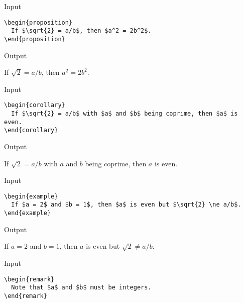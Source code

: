 \documentclass[a4paper, 11pt]{article}
\begin{document}
\begin{itembox}[l]{Input}
\begin{verbatim}
\begin{proposition}
  If $\sqrt{2} = a/b$, then $a^2 = 2b^2$.
\end{proposition}
\end{verbatim}
\end{itembox}

\begin{itembox}[l]{Output}
  \begin{proposition}
    If $\sqrt{2} = a/b$, then $a^2 = 2b^2$.
  \end{proposition}
\end{itembox}

\begin{itembox}[l]{Input}
\begin{verbatim}
\begin{corollary}
  If $\sqrt{2} = a/b$ with $a$ and $b$ being coprime, then $a$ is even.
\end{corollary}
\end{verbatim}
\end{itembox}

\begin{itembox}[l]{Output}
  \begin{corollary}
    If $\sqrt{2} = a/b$ with $a$ and $b$ being coprime, then $a$ is even.
  \end{corollary}
\end{itembox}

\begin{itembox}[l]{Input}
\begin{verbatim}
\begin{example}
  If $a = 2$ and $b = 1$, then $a$ is even but $\sqrt{2} \ne a/b$.
\end{example}
\end{verbatim}
\end{itembox}

\begin{itembox}[l]{Output}
  \begin{example}
    If $a = 2$ and $b = 1$, then $a$ is even but $\sqrt{2} \ne a/b$.
  \end{example}
\end{itembox}

\begin{itembox}[l]{Input}
\begin{verbatim}
\begin{remark}
  Note that $a$ and $b$ must be integers.
\end{remark}
\end{verbatim}
\end{itembox}
\end{document}
